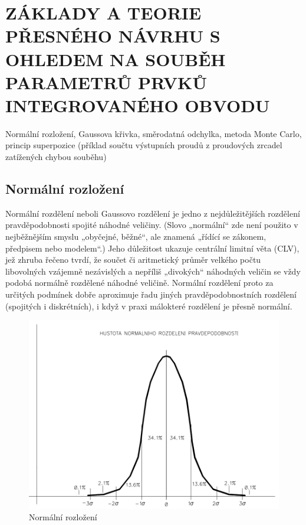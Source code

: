 \section{ZÁKLADY A TEORIE PŘESNÉHO NÁVRHU S OHLEDEM NA SOUBĚH PARAMETRŮ PRVKŮ INTEGROVANÉHO OBVODU}
Normální rozložení, Gaussova křivka, směrodatná odchylka, metoda Monte Carlo, princip superpozice (příklad součtu výstupních proudů z proudových zrcadel zatížených chybou souběhu)
\subsection{Normální rozložení}
Normální rozdělení neboli Gaussovo rozdělení je jedno z nejdůležitějších rozdělení pravděpodobnosti spojité náhodné veličiny. (Slovo „normální“ zde není použito v nejběžnějším smyslu „obyčejné, běžné“, ale znamená „řídící se zákonem, předpisem nebo modelem“.) Jeho důležitost ukazuje centrální limitní věta (CLV), jež zhruba řečeno tvrdí, že součet či aritmetický průměr velkého počtu libovolných vzájemně nezávislých a nepříliš „divokých“ náhodných veličin se vždy podobá normálně rozdělené náhodné veličině. Normální rozdělení proto za určitých podmínek dobře aproximuje řadu jiných pravděpodobnostních rozdělení (spojitých i diskrétních), i když v praxi málokteré rozdělení je přesně normální.
\begin{figure}[h]
   \begin{center}
     \includegraphics[scale=0.5]{images/normal.png}
   \end{center}
   \caption{Normální rozložení}
\end{figure}

